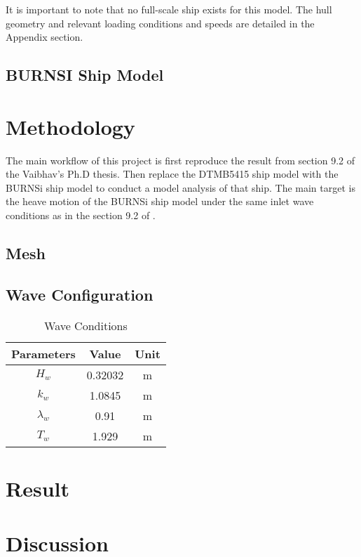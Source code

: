 \documentclass[12pt]{article} %
\begin{document}
It is important to note that no full-scale ship exists for this model. The hull geometry and relevant loading conditions and speeds are detailed in the Appendix section.



\subsection{BURNSI Ship Model}

\section{Methodology}
The main workflow of this project is first reproduce the result from section 9.2 of the Vaibhav's Ph.D thesis\cite{joshi2018}. 
Then replace the DTMB5415 ship model with the BURNSi ship model to conduct a model analysis of that ship. The main target is the
heave motion of the BURNSi ship model under the same inlet wave conditions as in the section 9.2 of \cite{joshi2018}.
\subsection{Mesh}

\subsection{Wave Configuration}
\begin{table}[ht]
    \caption{Wave Conditions}
    \centering
    \begin{tabular}{|c|c|c|}
        \hline
        Parameters & Value & Unit\\
        \hline   
        $H_w$ & 0.32032 & m \\
        $k_w$ & 1.0845 & m\\
        $\lambda_w$ & 0.91 & m\\
        $T_w$ & 1.929 & m \\
        \hline
    \end{tabular}
\end{table}


\section{Result}

\section{Discussion}
\end{document}
